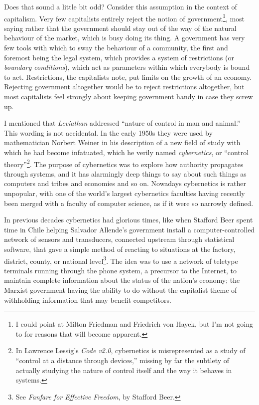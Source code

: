 Does that sound a little bit odd? Consider this assumption in the context of
capitalism. Very few capitalists entirely reject the notion of
government\footnote{I could point at Milton Friedman and Friedrich von Hayek,
but I'm not going to for reasons that will become apparent.}, most saying 
rather that the government should stay out of the way of the natural behaviour
of the market, which is busy doing its thing. A government has very few tools
with which to sway the behaviour of a community, the f\hbox{}irst and foremost
being the legal system, which provides a system of restrictions (or
\textit{boundary conditions}), which act as parameters within which everybody 
is bound to act.  Restrictions, the capitalists note, put limits on the growth
of an economy.  Rejecting government altogether would be to reject restrictions
altogether, but most capitalists feel strongly about keeping government handy 
in case they screw up.

I mentioned that \textit{Leviathan} addressed ``nature of control in man and
animal.'' This wording is not accidental. In the early 1950s they were used by
mathematician Norbert Weiner in his description of a new f\hbox{}ield of study
with which he had become infatuated, which he verily named 
\textit{cybernetics}, or ``control theory''\footnote{In Lawrence Lessig's
\textit{Code v2.0}, cybernetics is misrepresented as a study of ``control at a
distance through devices,'' missing by far the subtlety of actually studying 
the nature of control itself and the way it behaves in systems.  }. The purpose
of cybernetics was to explore how authority propagates through systems, and it
has alarmingly deep things to say about such things as computers and tribes and
economies and so on. Nowadays cybernetics is rather unpopular, with one of the
world's largest cybernetics faculties having recently been merged with a 
faculty of computer science, as if it were so narrowly def\hbox{}ined. 

In previous decades cybernetics had glorious times, like when Staf\hbox{}ford
Beer spent time in Chile helping Salvador Allende's government install a
computer-controlled network of sensors and transducers, connected upstream
through statistical software, that gave a simple method of reacting to
situations at the factory, district, county, or national level\footnote{See
\textit{Fanfare for Ef\hbox{}fective Freedom}, by Staf\hbox{}ford Beer.}. The
idea was to use a network of teletype terminals running through the phone
system, a precursor to the Internet, to maintain complete information about the
status of the nation's economy; the Marxist government having the ability to do
without the capitalist theme of withholding information that may benef\hbox{}it
competitors. 

